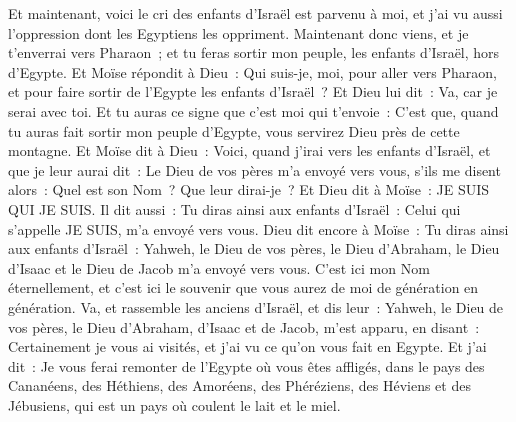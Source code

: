 \begin{multicols}{2}
Et maintenant, voici le cri des enfants d'Israël est parvenu à moi, et j'ai vu aussi l'oppression dont les Egyptiens les oppriment.
Maintenant donc viens, et je t'enverrai vers Pharaon~; et tu feras sortir mon peuple, les enfants d'Israël, hors d'Egypte.
Et Moïse répondit à Dieu~: Qui suis-je, moi, pour aller vers Pharaon, et pour faire sortir de l'Egypte les enfants d'Israël~?
Et Dieu lui dit~: Va, car je serai avec toi. Et tu auras ce signe que c'est moi qui t'envoie~: C'est que, quand tu auras fait sortir mon peuple d'Egypte, vous servirez Dieu près de cette montagne.
Et Moïse dit à Dieu~: Voici, quand j'irai vers les enfants d'Israël, et que je leur aurai dit~: Le Dieu de vos pères m'a envoyé vers vous, s'ils me disent alors~: Quel est son Nom~? Que leur dirai-je~?
 Et Dieu dit à Moïse~: JE SUIS QUI JE SUIS. Il dit aussi~: Tu diras ainsi aux enfants d'Israël~: Celui qui s'appelle JE SUIS, m'a envoyé vers vous.
Dieu dit encore à Moïse~: Tu diras ainsi aux enfants d'Israël~: Yahweh, le Dieu de vos pères, le Dieu d'Abraham, le Dieu d'Isaac et le Dieu de Jacob m'a envoyé vers vous. C'est ici mon Nom éternellement, et c'est ici le souvenir que vous aurez de moi de génération en génération.
Va, et rassemble les anciens d'Israël, et dis leur~: Yahweh, le Dieu de vos pères, le Dieu d'Abraham, d'Isaac et de Jacob, m'est apparu, en disant~: Certainement je vous ai visités, et j'ai vu ce qu'on vous fait en Egypte.
Et j'ai dit~: Je vous ferai remonter de l'Egypte où vous êtes affligés, dans le pays des Cananéens, des Héthiens, des Amoréens, des Phéréziens, des Héviens et des Jébusiens, qui est un pays où coulent le lait et le miel.

\end{multicols}
